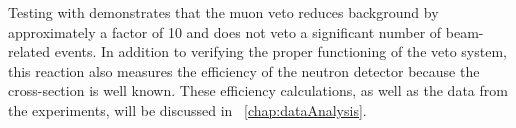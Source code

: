 Testing with \MgReaction demonstrates that the muon veto reduces background by approximately a factor of 10 and does not veto a significant number of beam-related events.  In addition to verifying the proper functioning of the veto system, this reaction also measures the efficiency of the neutron detector because the cross-section is well known.  These efficiency calculations, as well as the data from the \GeTargets experiments, will be discussed in {\chap}~\ref{chap:dataAnalysis}.


%
% 
% 
